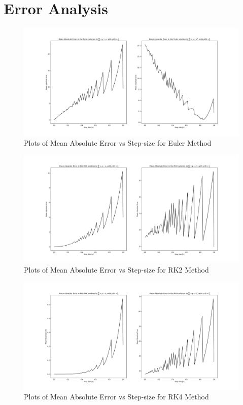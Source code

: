 \documentclass{scrartcl}
\begin{document}
\section{Error Analysis}
\begin{figure}[h]
    \centering
    \includegraphics[width=\linewidth]{"errors_euler.png"}
    \caption{Plots of Mean Absolute Error vs Step-size for Euler Method}
\end{figure}
\begin{figure}[h]
    \centering
    \includegraphics[width=\linewidth]{"errors_rk2.png"}
    \caption{Plots of Mean Absolute Error vs Step-size for RK2 Method}
\end{figure}
\begin{figure}[h]
    \centering
    \includegraphics[width=\linewidth]{"errors_rk4.png"}
    \caption{Plots of Mean Absolute Error vs Step-size for RK4 Method}
\end{figure}
\end{document}
